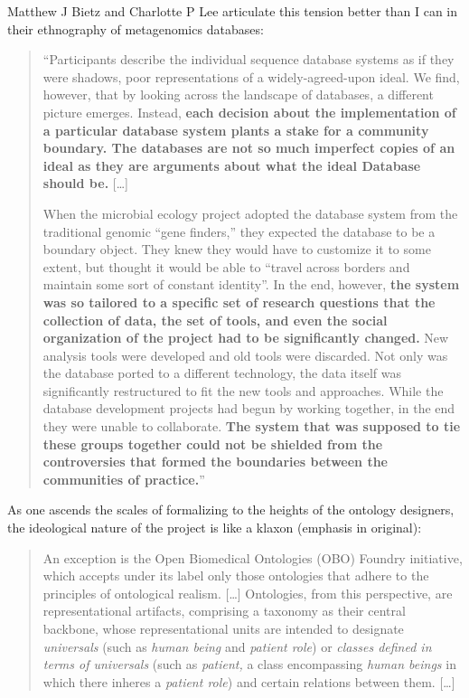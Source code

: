 \documentclass[10pt]{article}
\begin{document}
\begin{multicols}{2}
Matthew J Bietz and Charlotte P Lee articulate this tension better than
I can in their ethnography of metagenomics databases:

\begin{quote}
``Participants describe the individual sequence database systems as if
they were shadows, poor representations of a widely-agreed-upon ideal.
We find, however, that by looking across the landscape of databases, a
different picture emerges. Instead, \textbf{each decision about the
implementation of a particular database system plants a stake for a
community boundary. The databases are not so much imperfect copies of an
ideal as they are arguments about what the ideal Database should be.}
{[}\ldots{]}

When the microbial ecology project adopted the database system from the
traditional genomic ``gene finders,'' they expected the database to be a
boundary object. They knew they would have to customize it to some
extent, but thought it would be able to ``travel across borders and
maintain some sort of constant identity''. In the end, however,
\textbf{the system was so tailored to a specific set of research
questions that the collection of data, the set of tools, and even the
social organization of the project had to be significantly changed.} New
analysis tools were developed and old tools were discarded. Not only was
the database ported to a different technology, the data itself was
significantly restructured to fit the new tools and approaches. While
the database development projects had begun by working together, in the
end they were unable to collaborate. \textbf{The system that was
supposed to tie these groups together could not be shielded from the
controversies that formed the boundaries between the communities of
practice.}'' \cite{bietzCollaborationMetagenomicsSequence2009} 
\end{quote}

As one ascends the scales of formalizing to the heights of the ontology
designers, the ideological nature of the project is like a klaxon
(emphasis in original):

\begin{quote}
An exception is the Open Biomedical Ontologies (OBO) Foundry initiative,
which accepts under its label only those ontologies that adhere to the
principles of ontological realism. {[}\ldots{]} Ontologies, from this
perspective, are representational artifacts, comprising a taxonomy as
their central backbone, whose representational units are intended to
designate \emph{universals} (such as \emph{human being} and
\emph{patient role}) or \emph{classes defined in terms of universals}
(such as \emph{patient,} a class encompassing \emph{human beings} in
which there inheres a \emph{patient role}) and certain relations between
them. {[}\ldots{]}


\end{quote}
\end{multicols}
\end{document}
